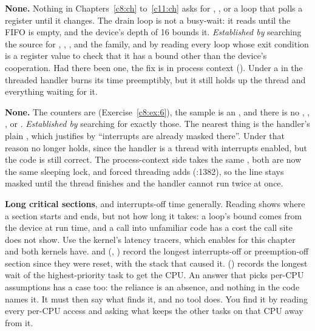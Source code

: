 \textbf{None.} Nothing in Chapters~\ref{c8:ch} to~\ref{c11:ch} asks for ,
,  or a loop that polls a register until it changes. The drain loop is
not a busy-wait: it reads until the FIFO is empty, and the device's depth of 16 bounds it.
\emph{Established by} searching the source for , , ,
 and the  family, and by reading every loop whose exit
condition is a register value to check that it has a bound other than the device's cooperation. Had
there been one, the fix is  in process context (). Under
 a  in the threaded handler burns its time preemptibly, but it still
holds up the thread and everything waiting for it.

 \textbf{None.} The counters are  (Exercise~\ref{c8:ex:6}), the sample is an
, and there is no , , ,
 or . \emph{Established by} searching for exactly those. The
nearest thing is the handler's plain , which  justifies by
``interrupts are already masked there''. Under  that reason no longer holds, since
the handler is a thread with interrupts enabled, but the code is still correct. The process-context
side takes the same , both are now the same sleeping lock, and forced threading
adds  (:1382), so the line stays masked until the
thread finishes and the handler cannot run twice at once.

 \textbf{Long critical sections}, and interrupts-off time generally. Reading shows where a
section starts and ends, but not how long it takes: a loop's bound comes from the device at run
time, and a call into unfamiliar code has a cost the call site does not show. Use the kernel's
latency tracers, which  enables for this chapter and both kernels have.
 and  (, )
record the longest interrupts-off or preemption-off section since they were reset, with the stack
that caused it.  () records the longest wait of the
highest-priority task to get the CPU. An answer that picks per-CPU assumptions has a case too: the
reliance is an absence, and nothing in the code names it. It must then say what finds it, and no
tool does. You find it by reading every per-CPU access and asking what keeps the other tasks on
that CPU away from it.

